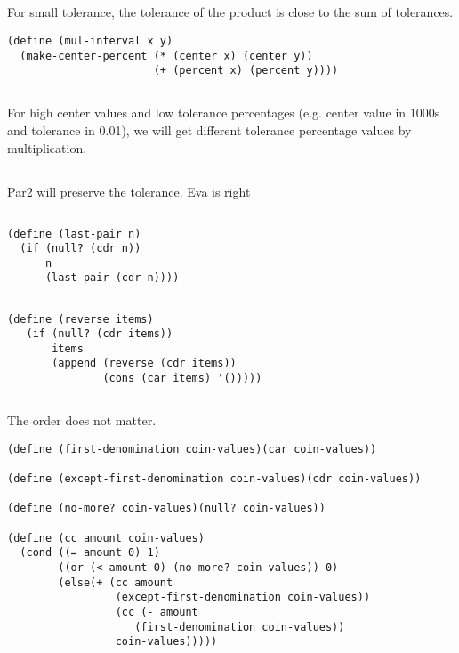 \documentclass{article}
\begin{document}
\subsection{}
For small tolerance, the tolerance of the product is close to the sum of tolerances.
\begin{verbatim}
(define (mul-interval x y)
  (make-center-percent (* (center x) (center y))
                       (+ (percent x) (percent y))))
\end{verbatim}

\subsection{}
For high center values and low tolerance percentages (e.g. center value in 1000s and tolerance in 0.01), we will get different tolerance percentage values by multiplication.

\subsection{}
Par2 will preserve the tolerance. Eva is right

\subsection{}

\subsection{}
\begin{verbatim}
(define (last-pair n) 
  (if (null? (cdr n)) 
      n 
      (last-pair (cdr n))))
\end{verbatim}

\subsection{}
\begin{verbatim}
(define (reverse items) 
   (if (null? (cdr items)) 
       items 
       (append (reverse (cdr items)) 
               (cons (car items) '())))) 
\end{verbatim}
\subsection{}
The order does not matter.

\begin{verbatim}
(define (first-denomination coin-values)(car coin-values))

(define (except-first-denomination coin-values)(cdr coin-values))

(define (no-more? coin-values)(null? coin-values))
  
(define (cc amount coin-values)
  (cond ((= amount 0) 1)
        ((or (< amount 0) (no-more? coin-values)) 0)
        (else(+ (cc amount
                 (except-first-denomination coin-values))
                 (cc (- amount
                    (first-denomination coin-values))
                 coin-values)))))
\end{verbatim}
\end{document}
